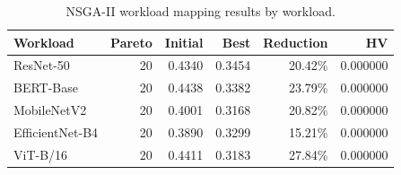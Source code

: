 \begin{table}[t]
\centering
\caption{NSGA-II workload mapping results by workload.}
\label{tab:nsga2-results}
\begin{tabular}{lrrrrr}
\toprule
Workload & Pareto & Initial & Best & Reduction & HV \\
\midrule
ResNet-50 & 20 & 0.4340 & 0.3454 & 20.42\% & 0.000000 \\
BERT-Base & 20 & 0.4438 & 0.3382 & 23.79\% & 0.000000 \\
MobileNetV2 & 20 & 0.4001 & 0.3168 & 20.82\% & 0.000000 \\
EfficientNet-B4 & 20 & 0.3890 & 0.3299 & 15.21\% & 0.000000 \\
ViT-B/16 & 20 & 0.4411 & 0.3183 & 27.84\% & 0.000000 \\
\bottomrule
\end{tabular}
\end{table}
